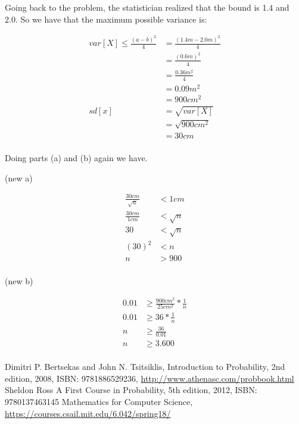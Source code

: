 \documentclass[10pt,a4paper]{article}
\begin{document}
	Going back to the problem, the statistician realized that the bound is 1.4 and 2.0. So we have that the maximum possible variance is:
	
	\begin{align*}
	var[X] \le \frac{(a-b)^2}{4} &= \frac{(1.4m-2.0m)^2}{4}\\
	& = \frac{(0.6m)^2}{4}\\
	& = \frac{0.36m^2}{4}\\	
	& = 0.09m^2\\	
	& = 900cm^2
	\\
	sd[x] &= \sqrt{var[X]}\\
	&= \sqrt{900cm^2}\\
	&= 30cm\\
	\end{align*}
	
	Doing parts (a) and (b) again we have.

	(new a)	
	
	\begin{align*}
	\frac{30cm}{\sqrt{n}} &< 1cm\\
	\frac{30cm}{1cm} &< \sqrt{n}\\
	30 &< \sqrt{n}\\
	(30)^2 &< n\\
	n &> 900\\	
	\end{align*}
	
	(new b)
	
	\begin{align*}
		0.01 &\ge \frac{900cm^2}{25cm^2} * \frac{1}{n}\\
		0.01 &\ge 36 * \frac{1}{n}\\		
		n &\ge \frac{36}{0.01}\\		
		n &\ge 3.600\\				
	\end{align*}
		
	\begin{thebibliography}{9}		
		Dimitri P. Bertsekas and John N. Tsitsiklis,
		Introduction to Probability,
		2nd edition,
		2008,
		ISBN: 9781886529236,
		\url{http://www.athenasc.com/probbook.html}
		Sheldon Ross
		A First Course in Probability,
		5th edition,
		2012,
		ISBN: 9780137463145	
		Mathematics for Computer Science,
		\url{https://courses.csail.mit.edu/6.042/spring18/}
	\end{thebibliography}
\end{document}
